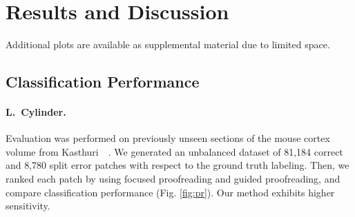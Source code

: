 \section{Results and Discussion}

Additional plots are available as supplemental material due to limited space. 

\subsection{Classification Performance}

\paragraph{L.~Cylinder.} Evaluation was performed on previously unseen sections of the mouse cortex volume from Kasthuri~\etal~\cite{kasthuri2015saturated}. We generated an unbalanced dataset of 81,184 correct and 8,780 split error patches with respect to the ground truth labeling. Then, we ranked each patch by using focused proofreading and guided proofreading, and compare classification performance (Fig. \ref{fig:pr}). Our method exhibits higher sensitivity.%


